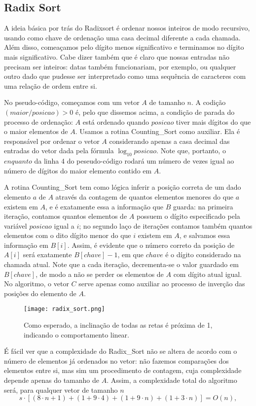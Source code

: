 \documentclass{article}
\begin{document}
\subsection{Radix Sort}
A ideia básica por trás do Radixsort é ordenar nossos inteiros de modo recursivo, usando como chave de ordenação uma casa decimal diferente a cada chamada. Além disso, comeaçamos pelo dígito menos significativo e terminamos no dígito mais significativo. Cabe dizer também que é claro que nossas entradas não precisam ser inteiros: datas também funcionariam, por exemplo, ou qualquer outro dado que pudesse ser interpretado como uma sequência de caracteres com uma relação de ordem entre si.\par
%
No pseudo-código, começamos com um vetor $A$ de tamanho $n$. A codição $(maior/posicao)>0$ é, pelo que dissemos acima, a condição de parada do processo de ordenação: $A$ está ordenado quando $posicao$ tiver mais dígitos do que o maior elementos de $A$. Usamos a rotina Counting\_Sort como auxiliar. Ela é responsável por ordenar o vetor $A$ considerando apenas a casa decimal das entradas do vetor dada pela fórmula $\log_{10} posicao$. Note que, portanto, o $enquanto$ da linha 4 do peseudo-código rodará um número de vezes igual ao número de dígitos do maior elemento contido em $A$.\par
%
A rotina Counting\_Sort tem como lógica inferir a posição correta de um dado elemento $a$ de $A$ através da contagem de quantos elementos menores do que $a$ existem em $A$, e é exatamente essa a informação que $B$ guarda: na primeira iteração, contamos quantos elementos de $A$ possuem o dígito especificado pela variável $posicao$ igual a $i$; no segundo laço de iterações contamos também quantos elementos com o dito dígito menor do que $i$ existem em $A$, e salvamos essa informação em $B[i]$. Assim, é evidente que o número correto da posição de $A[i]$ será exatamente $B[chave] - 1$, em que $chave$ é o dígito considerado na chamada atual. Note que a cada iteração, decrementa-se o valor guardado em $B[chave]$, de modo a não se perder os elementos de $A$ com dígito atual igual. No algoritmo, o vetor $C$ serve apenas como auxiliar ao processo de inverção das posições do elemento de $A$.\par
%
\begin{figure}[h]
    \centering
    \texttt{[image: radix\_sort.png]}
    \caption{Como esperado, a inclinação de todas as retas é próxima de 1, indicando o comportamento linear.}
\end{figure}
%
É fácil ver que a complexidade do Radix\_Sort não se altera de acordo com o número de elementos já ordenados no vetor: não fazemos comparações dos elementos entre si, mas sim um procedimento de contagem, cuja complexidade depende apenas do tamanho de $A$. Assim, a complexidade total do algoritmo será, para qualquer vetor de tamanho $n$ \[s\cdot\left[(8 \cdot n + 1) + (1 + 9\cdot4) + (1 + 9\cdot n) + (1 + 3\cdot n)\right] = O(n),\]
\end{document}
